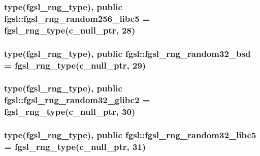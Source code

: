 \subsubsection[{fgsl\+\_\+rng\+\_\+random256\+\_\+libc5}]{\setlength{\rightskip}{0pt plus 5cm}type({\bf fgsl\+\_\+rng\+\_\+type}), public fgsl\+::fgsl\+\_\+rng\+\_\+random256\+\_\+libc5 = {\bf fgsl\+\_\+rng\+\_\+type}(c\+\_\+null\+\_\+ptr, 28)}\label{namespacefgsl_a07865f4f3a0cd07f3e922da1b3616e68}
\hypertarget{namespacefgsl_a1adf276b8f59b011e5a28451b9245a96}{}
\subsubsection[{fgsl\+\_\+rng\+\_\+random32\+\_\+bsd}]{\setlength{\rightskip}{0pt plus 5cm}type({\bf fgsl\+\_\+rng\+\_\+type}), public fgsl\+::fgsl\+\_\+rng\+\_\+random32\+\_\+bsd = {\bf fgsl\+\_\+rng\+\_\+type}(c\+\_\+null\+\_\+ptr, 29)}\label{namespacefgsl_a1adf276b8f59b011e5a28451b9245a96}
\hypertarget{namespacefgsl_a26cb9ca6b94f3b1db24cdc006f07196a}{}
\subsubsection[{fgsl\+\_\+rng\+\_\+random32\+\_\+glibc2}]{\setlength{\rightskip}{0pt plus 5cm}type({\bf fgsl\+\_\+rng\+\_\+type}), public fgsl\+::fgsl\+\_\+rng\+\_\+random32\+\_\+glibc2 = {\bf fgsl\+\_\+rng\+\_\+type}(c\+\_\+null\+\_\+ptr, 30)}\label{namespacefgsl_a26cb9ca6b94f3b1db24cdc006f07196a}
\hypertarget{namespacefgsl_a85c8b85216d7705c54a071e06a65d871}{}
\subsubsection[{fgsl\+\_\+rng\+\_\+random32\+\_\+libc5}]{\setlength{\rightskip}{0pt plus 5cm}type({\bf fgsl\+\_\+rng\+\_\+type}), public fgsl\+::fgsl\+\_\+rng\+\_\+random32\+\_\+libc5 = {\bf fgsl\+\_\+rng\+\_\+type}(c\+\_\+null\+\_\+ptr, 31)}\label{namespacefgsl_a85c8b85216d7705c54a071e06a65d871}
\hypertarget{namespacefgsl_a4f1fadb8ae8e69bc97fa0ce10b8c2669}{}
